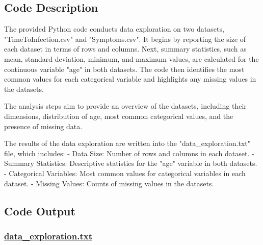 \documentclass[11pt]{article}
\begin{document}
\subsection{Code Description}

The provided Python code conducts data exploration on two datasets, "TimeToInfection.csv" and "Symptoms.csv". It begins by reporting the size of each dataset in terms of rows and columns. Next, summary statistics, such as mean, standard deviation, minimum, and maximum values, are calculated for the continuous variable "age" in both datasets. The code then identifies the most common values for each categorical variable and highlights any missing values in the datasets.

The analysis steps aim to provide an overview of the datasets, including their dimensions, distribution of age, most common categorical values, and the presence of missing data. 

The results of the data exploration are written into the "data\_exploration.txt" file, which includes:
- Data Size: Number of rows and columns in each dataset.
- Summary Statistics: Descriptive statistics for the "age" variable in both datasets.
- Categorical Variables: Most common values for categorical variables in each dataset.
- Missing Values: Counts of missing values in the datasets.

\subsection{Code Output}\hypertarget{file-data-exploration-txt}{}

\subsubsection*{\hyperlink{code-Data Exploration-data-exploration-txt}{data\_exploration.txt}}
\end{document}
